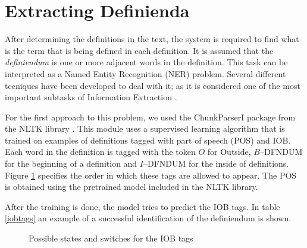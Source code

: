 \documentclass[a4paper]{easychair}
\begin{document}
\section{Extracting Definienda}
After determining the definitions in the text, the system is required to find what is the term that is being defined in each definition. It is assumed that the  \emph{definiendum} is one or more adjacent words in the definition. This task can be interpreted as a Named Entity Recognition (NER) problem. Several different tecniques have been developed to deal with it;  as it is considered one of the most important subtasks of Information Extraction \cite{nersurvey}.

 For the first approach to this problem, we used the ChunkParserI package from the NLTK library \cite{nltk}. This module uses a supervised learning algorithm that is trained on examples of definitions tagged with  part of speech (POS) and IOB. Each word in the definition is tagged with the token $O$ for Outside, $B$--DFNDUM for the beginning of a definition and $I$--DFNDUM for the inside of definitions. Figure \ref{iobfsm} specifies the order in which these tags are allowed to appear. The POS is obtained using the pretrained model included in the NLTK library.

After the training  is done, the model tries to predict the IOB tags. In table \ref{iobtags} an example of a successful identification of the definiendum is shown.
 \begin{figure}[h]
     \centering
{}
     \caption{\label{iobfsm} Possible states and switches for the IOB tags}
\end{figure}
\end{document}

